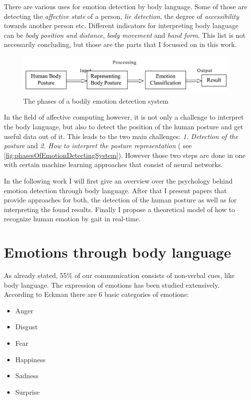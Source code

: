 \documentclass[conference]{IEEEtran}
\begin{document}
There are various uses for emotion detection by body language. Some of those are detecting the \emph{affective state} of a person, \emph{lie detection}, the degree of \emph{accessibility} towards another person etc. Different indicators for interpreting body language can be \emph{body position and distance}\cite{mccoll2012affect,mehrabian1969significance}, \emph{body movement}\cite{singhsignificance,karg2012pattern} and \emph{hand form}\cite{wang2007hand,triesch2001system}. This list is not necessarily concluding, but those are the parts that I focussed on in this work.

\begin{figure}[H]
\centering
   \includegraphics[width=\linewidth]{phasesOfEmotionDetectingSystem.jpg}
  \caption{The phases of a bodily emotion detection system\cite{singhsignificance}}
  \label{fig:phasesOfEmotionDetectingSystem}
\end{figure}


In the field of affective computing however, it is not only a challenge to interpret the body language, but also to detect the position of the human posture and get useful data out of it. This leads to the two main challenges: \emph{1. Detection of the posture} and \emph{2. How to interpret the posture representation} ( see \autoref{fig:phasesOfEmotionDetectingSystem}\cite{singhsignificance}). However those two steps are done in one with certain machine learning approaches that consist of neural networks\cite{schindler2008recognizing, kleinsmith2007recognizing, kleinsmith2005incremental}.

In the following work I will first give an overview over the psychology behind emotion detection through body language. After that I present papers that provide approaches for both, the detection of the human posture as well as for interpreting the found results. Finally I propose a theoretical model of how to recognize human emotion by gait in real-time. 

\section{Emotions through body language}
\label{sec:emotions}
As already stated, 55\% of our communication consists of non-verbal cues, like body language. The expression of emotions has been studied extensively\cite{tomkins1962,ekmann1973universal,ekman1993facial,frijda1986emotions}. According to Eckman\cite{eckman2003emotions} there are 6 basic categories of emotions:
\begin{itemize}
\item{Anger}
\item{Disgust}
\item{Fear}
\item{Happiness}
\item{Sadness}
\item{Surprise}
\end{itemize}
\end{document}
